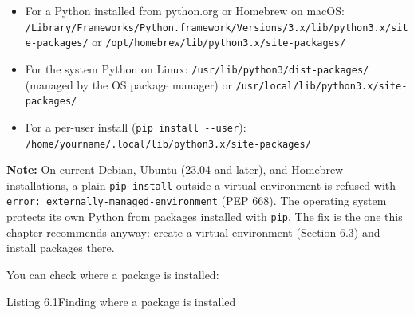 \begin{itemize}
\tightlist
\item
  For a Python installed from python.org or Homebrew on macOS: \texttt{/}\allowbreak{}\texttt{Library/}\allowbreak{}\texttt{Frameworks/}\allowbreak{}\texttt{Python.}\allowbreak{}\texttt{framework/}\allowbreak{}\texttt{Versions/}\allowbreak{}\texttt{3.}\allowbreak{}\texttt{x/}\allowbreak{}\texttt{lib/}\allowbreak{}\texttt{python3.}\allowbreak{}\texttt{x/}\allowbreak{}\texttt{site-}\allowbreak{}\texttt{packages/} or \texttt{/}\allowbreak{}\texttt{opt/}\allowbreak{}\texttt{homebrew/}\allowbreak{}\texttt{lib/}\allowbreak{}\texttt{python3.}\allowbreak{}\texttt{x/}\allowbreak{}\texttt{site-}\allowbreak{}\texttt{packages/}
\item
  For the system Python on Linux: \texttt{/}\allowbreak{}\texttt{usr/}\allowbreak{}\texttt{lib/}\allowbreak{}\texttt{python3/}\allowbreak{}\texttt{dist-}\allowbreak{}\texttt{packages/} (managed by the OS package manager) or \texttt{/}\allowbreak{}\texttt{usr/}\allowbreak{}\texttt{local/}\allowbreak{}\texttt{lib/}\allowbreak{}\texttt{python3.}\allowbreak{}\texttt{x/}\allowbreak{}\texttt{site-}\allowbreak{}\texttt{packages/}
\item
  For a per-user install (\texttt{pip\ install\ -\/-user}): \texttt{/}\allowbreak{}\texttt{home/}\allowbreak{}\texttt{yourname/}\allowbreak{}\texttt{.}\allowbreak{}\texttt{local/}\allowbreak{}\texttt{lib/}\allowbreak{}\texttt{python3.}\allowbreak{}\texttt{x/}\allowbreak{}\texttt{site-}\allowbreak{}\texttt{packages/}
\end{itemize}

\begin{notebox}

\textbf{Note:} On current Debian, Ubuntu (23.04 and later), and Homebrew installations, a plain \texttt{pip\ install} outside a virtual environment is refused with \texttt{error:}\allowbreak{}\texttt{\ externally-}\allowbreak{}\texttt{managed-}\allowbreak{}\texttt{environment} (PEP 668). The operating system protects its own Python from packages installed with \texttt{pip}. The fix is the one this chapter recommends anyway: create a virtual environment (Section 6.3) and install packages there.

\end{notebox}

\noindent{}You can check where a package is installed:

\begin{codeboxcap}[short]{\textcolor{accent}{Listing 6.1}\enspace Finding where a package is installed}

\begin{Shaded}
\begin{Highlighting}[]
\NormalTok{)}
\end{Highlighting}
\end{Shaded}

\end{codeboxcap}

